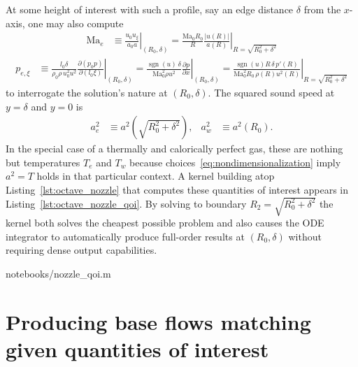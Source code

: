 \documentclass[letterpaper,11pt,nointlimits,reqno]{amsart}
\newcommand{\Mach}[1][]{\mbox{Ma}_{#1}}
\begin{document}
At some height of interest with such a profile, say an edge distance $\delta$
from the $x$-axis, one may also compute
\begin{align}
  \Mach[e]{}
  &\equiv
  \left. \frac{u_0 u_\xi}{a_0 a} \right|_{\left(R_0,\delta\right)}
  =
  \left.
    \frac{\Mach[0]{} R_0}{R}
    \frac{\left|u\!\left(R\right)\right|}
         {      a\!\left(R\right)       }
  \right|_{R = \sqrt{R_0^2 + \delta^2}}
\end{align}
\begin{align}
  p_{e,\xi}
  &\equiv
  \left.
  \frac{l_0 \delta}{\rho_0 \rho \, u_0^2 u^2}
    \frac{\partial\left(p_0 p\right)}{\partial\left(l_0 \xi\right)}
  \right|_{\left(R_0,\delta\right)}
  =
  \left.
    \frac{\operatorname{sgn}(u) \, \delta}{\Mach[0]^2 \rho u^2}
      \frac{\partial{}p}{\partial{}x}
  \right|_{\left(R_0,\delta\right)}
  =
  \left.
    \frac{\operatorname{sgn}(u) R \, \delta \, p'\!\left(R\right)}
         {\Mach[0]^2 R_0 \, \rho\!\left(R\right) u^2\!\left(R\right)}
  \right|_{R=\sqrt{R_0^2 + \delta^2}}
\end{align}
to interrogate the solution's nature at $\left(R_0, \delta\right)$.  The squared
sound speed at $y=\delta$ and $y=0$ is
\begin{align}
  a^2_e
  &\equiv
  a^2\!\left(\sqrt{R_0^2 + \delta^2}\right)
,
&
  a^2_w
  &\equiv
  a^2\!\left(R_0\right)
.
\end{align}
In the special case of a thermally and calorically perfect gas, these are
nothing but temperatures $T_e$ and $T_w$ because
choices~\eqref{eq:nondimensionalization} imply $a^2 = T$ holds in that
particular context.  A kernel building atop Listing~\ref{lst:octave_nozzle}
that computes these quantities of interest appears in
Listing~\ref{lst:octave_nozzle_qoi}.  By solving to boundary $R_2 = \sqrt{R_0^2
+ \delta^2}$ the kernel both solves the cheapest possible problem and also
causes the ODE integrator to automatically produce full-order results at
$\left(R_0,\delta\right)$ without requiring dense output capabilities.


                {notebooks/nozzle_qoi.m}

\pagebreak[4]{}

\section{Producing base flows matching given quantities of interest}
\end{document}
